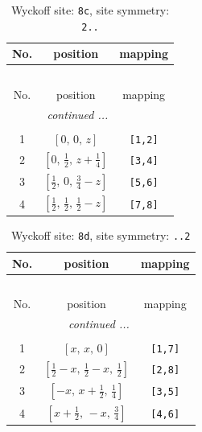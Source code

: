 \documentclass[fleqn,8pt]{jsarticle}
\begin{document}
\renewcommand{\arraystretch}{1.2}
\begin{longtable}{ccc}
\caption{Wyckoff site: {\tt 8c}, site symmetry: {\tt 2..}}
 \\
 \hline \hline
No. & position & mapping \\ \hline \endfirsthead

\multicolumn{2}{l}{\tablename\ \thetable{}} \\
 \hline \hline
No. & position & mapping \\ \hline \endhead

 \hline \hline
\multicolumn{2}{r}{\footnotesize\it continued ...} \\ \endfoot

 \hline \hline
\multicolumn{2}{r}{} \\ \endlastfoot

1 & $\left[ 0,\, 0,\, z \right]$ & {\tt [1,2]} \\ \hline
2 & $\left[ 0,\, \frac{1}{2},\, z + \frac{1}{4} \right]$ & {\tt [3,4]} \\ \hline
3 & $\left[ \frac{1}{2},\, 0,\, \frac{3}{4} - z \right]$ & {\tt [5,6]} \\ \hline
4 & $\left[ \frac{1}{2},\, \frac{1}{2},\, \frac{1}{2} - z \right]$ & {\tt [7,8]} \\
\end{longtable}
\renewcommand{\arraystretch}{1.2}
\begin{longtable}{ccc}
\caption{Wyckoff site: {\tt 8d}, site symmetry: {\tt ..2}}
 \\
 \hline \hline
No. & position & mapping \\ \hline \endfirsthead

\multicolumn{2}{l}{\tablename\ \thetable{}} \\
 \hline \hline
No. & position & mapping \\ \hline \endhead

 \hline \hline
\multicolumn{2}{r}{\footnotesize\it continued ...} \\ \endfoot

 \hline \hline
\multicolumn{2}{r}{} \\ \endlastfoot

1 & $\left[ x,\, x,\, 0 \right]$ & {\tt [1,7]} \\ \hline
2 & $\left[ \frac{1}{2} - x,\, \frac{1}{2} - x,\, \frac{1}{2} \right]$ & {\tt [2,8]} \\ \hline
3 & $\left[ - x,\, x + \frac{1}{2},\, \frac{1}{4} \right]$ & {\tt [3,5]} \\ \hline
4 & $\left[ x + \frac{1}{2},\, - x,\, \frac{3}{4} \right]$ & {\tt [4,6]} \\
\end{longtable}
\end{document}
